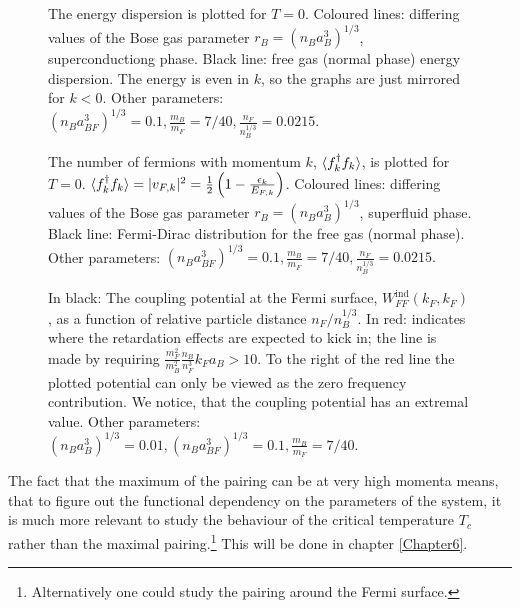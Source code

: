 \begin{figure} 
\begin{center}  
  
\caption{The energy dispersion is plotted for $T = 0$. Coloured lines: differing values of the Bose gas parameter $r_B = (n_Ba_B^3)^{1/3}$, superconductiong phase. Black line: free gas (normal phase) energy dispersion. The energy is even in $k$, so the graphs are just mirrored for $k < 0$. Other parameters: $(n_Ba_{BF}^3)^{1/3} = 0.1, \frac{m_B}{m_F} = 7/40, \frac{n_F}{n_B^{1/3}} = 0.0215.$ }  
\label{fig.EnergyDispersion}  
\end{center}    
\end{figure}


\begin{figure} 
\begin{center}  
  
\caption{The number of fermions with momentum $k$, $\braket{f_k^\dagger f_k}$, is plotted for $T = 0$. $\braket{f_k^\dagger f_k} = |v_{F,k}|^2 = \frac{1}{2}\left(1 - \frac{\epsilon_k}{E_{F,k}}\right)$. Coloured lines: differing values of the Bose gas parameter $r_B = (n_Ba_B^3)^{1/3}$, superfluid phase. Black line: Fermi-Dirac distribution for the free gas (normal phase).  Other parameters: $(n_Ba_{BF}^3)^{1/3} = 0.1, \frac{m_B}{m_F} = 7/40, \frac{n_F}{n_B^{1/3}} = 0.0215.$  }  
\label{fig.Occupancy}  
\end{center}    
\end{figure}

\begin{figure} 
\begin{center}  
  
\caption{In black: The coupling potential at the Fermi surface, $W_{FF}^\text{ind}(k_F,k_F)$, as a function of relative particle distance $n_F/n_B^{1/3}$. In red: indicates where the retardation effects are expected to kick in; the line is made by requiring $\frac{m_F^2}{m_B^2}\frac{n_B}{n_F^3} k_Fa_B > 10$.  To the right of the red line the plotted potential can only be viewed as the zero frequency contribution. We notice, that the coupling potential has an extremal value. Other parameters: $(n_Ba_B^3)^{1/3} = 0.01, (n_Ba_{BF}^3)^{1/3} = 0.1, \frac{m_B}{m_F} = 7/40.$}  
\label{fig.maxkDeltakaBdepend}  
\end{center}    
\end{figure}

The fact that the maximum of the pairing can be at very high momenta means, that to figure out the functional dependency on the parameters of the system, it is much more relevant to study the behaviour of the critical temperature $T_c$ rather than the maximal pairing.\footnote{Alternatively one could study the pairing around the Fermi surface.} This will be done in chapter \ref{Chapter6}.

